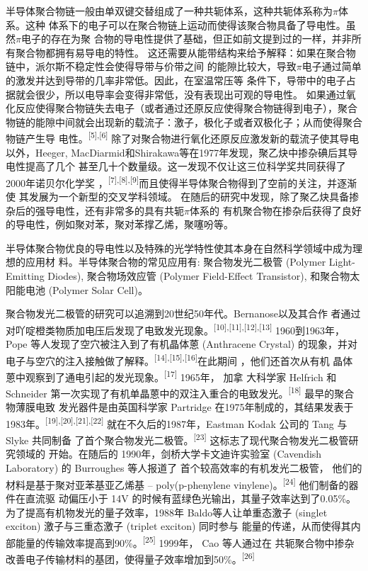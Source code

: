 \documentclass[12pt,]{report}
\begin{document}
半导体聚合物链一般由单双键交替组成了一种共轭体系，这种共轭体系称为\(\pi\)体系。这种
体系下的电子可以在聚合物链上运动而使得该聚合物具备了导电性。虽然\(\pi\)电子的存在为聚
合物的导电性提供了基础，但正如前文提到过的一样，并非所有聚合物都拥有易导电的特性。
这还需要从能带结构来给予解释：如果在聚合物链中，派尔斯不稳定性会使得导带与价带之间
的能隙比较大，导致\(\pi\)电子通过简单的激发并达到导带的几率非常低。因此，在室温常压等
条件下，导带中的电子占据就会很少，所以电导率会变得非常低，没有表现出可观的导电性。
如果通过氧化反应使得聚合物链失去电子（或者通过还原反应使得聚合物链得到电子），聚合
物链的能隙中间就会出现新的载流子：激子，极化子或者双极化子；从而使得聚合物链产生导
电性。\textsuperscript{{[}5{]},{[}6{]}}
除了对聚合物进行氧化还原反应激发新的载流子使其导电以外，Heeger,
MacDiarmid和Shirakawa等在1977年发现，聚乙炔中掺杂碘后其导电性提高了几个
甚至几十个数量级。这一发现不仅让这三位科学奖共同获得了2000年诺贝尔化学奖
，\textsuperscript{{[}7{]},{[}8{]},{[}9{]}}而且使得半导体聚合物得到了空前的关注，并逐渐使
其发展为一个新型的交叉学科领域。
在随后的研究中发现，除了聚乙炔具备掺杂后的强导电性，还有非常多的具有共轭\(\pi\)体系的
有机聚合物在掺杂后获得了良好的导电性，例如聚对苯，聚对苯撑乙烯，聚噻吩等。

半导体聚合物优良的导电性以及特殊的光学特性使其本身在自然科学领域中成为理想的应用材
料。半导体聚合物的常见应用有: 聚合物发光二极管 (Polymer Light-Emitting
Diodes), 聚合物场效应管 (Polymer Field-Effect Transistor),
和聚合物太阳能电池 (Polymer Solar Cell)。

聚合物发光二极管的研究可以追溯到20世纪50年代。Bernanose以及其合作
者通过对吖啶橙类物质加电压后发现了电致发光现象。\textsuperscript{{[}10{]},{[}11{]},{[}12{]},{[}13{]}}
1960到1963年，Pope 等人发现了空穴被注入到了有机晶体蒽 (Anthracene
Crystal)
的现象，并对电子与空穴的注入接触做了解释。\textsuperscript{{[}14{]},{[}15{]},{[}16{]}}在此期间
，他们还首次从有机
晶体蒽中观察到了通电引起的发光现象。\textsuperscript{{[}17{]}} 1965年，
加拿 大科学家 Helfrich 和 Schneider
第一次实现了有机单晶蒽中的双注入重合的电致发光。\textsuperscript{{[}18{]}}
最早的聚合物薄膜电致 发光器件是由英国科学家 Partridge
在1975年制成的，其结果发表于1983年。\textsuperscript{{[}19{]},{[}20{]},{[}21{]},{[}22{]}}
就在不久后的1987年，Eastman Kodak 公司的 Tang 与 Slyke 共同制备
了首个聚合物发光二极管。\textsuperscript{{[}23{]}}
这标志了现代聚合物发光二极管研究领域的 开始。在随后的
1990年，剑桥大学卡文迪许实验室 (Cavendish Laboratory) 的 Burroughes
等人报道了 首个较高效率的有机发光二极管，
他们的材料是基于聚对亚苯基亚乙烯基 -- poly(p-phenylene
vinylene)。\textsuperscript{{[}24{]}} 他们制备的器件在直流驱 动偏压小于
14V 的时候有蓝绿色光输出，其量子效率达到了0.05\%。
为了提高有机物发光的量子效率，1988年 Baldo等人让单重态激子 (singlet
exciton) 激子与三重态激子 (triplet exciton) 同时参与
能量的传递，从而使得其内部能量的传输效率提高到90\%。\textsuperscript{{[}25{]}}
1999年， Cao 等人通过在
共轭聚合物中掺杂改善电子传输材料的基团，使得量子效率增加到50\%。\textsuperscript{{[}26{]}}
\end{document}
